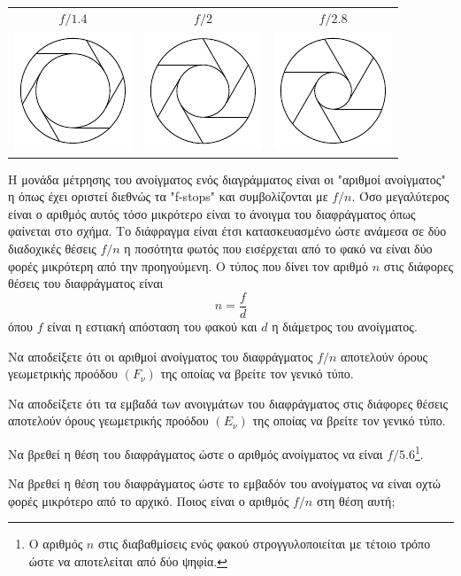 \documentclass[a4paper,11pt]{article}
\begin{document}
\begin{center}
\begin{tabular}{ccc}
$ f/1.4 $ & $ f/2 $ & $ f/2.8 $\\
\includegraphics{Sxhmata/1}
& 
\includegraphics{Sxhmata/2}
 & 
\includegraphics{Sxhmata/3}
 \\ 
\end{tabular} 
\end{center}
Η μονάδα μέτρησης του ανοίγματος ενός διαγράμματος είναι οι "αριθμοί ανοίγματος" η όπως έχει οριστεί διεθνώς τα "f-stops" και συμβολίζονται με $ f/n $. Όσο μεγαλύτερος είναι ο αριθμός αυτός τόσο μικρότερο είναι το άνοιγμα του διαφράγματος όπως φαίνεται στο σχήμα. Το διάφραγμα είναι έτσι κατασκευασμένο ώστε ανάμεσα σε δύο διαδοχικές θέσεις $ f/n $ η ποσότητα φωτός που εισέρχεται από το φακό να είναι δύο φορές μικρότερη από την προηγούμενη. Ο τύπος που δίνει τον αριθμό $ n $ στις διάφορες θέσεις του διαφράγματος είναι 
\[ n=\dfrac{f}{d} \]
όπου $ f $ είναι η εστιακή απόσταση του φακού και $ d $ η διάμετρος του ανοίγματος.
\begin{rlist}
\item Να αποδείξετε ότι οι αριθμοί ανοίγματος του διαφράγματος $ f/n $ αποτελούν όρους γεωμετρικής προόδου $ (F_\nu) $ της οποίας να βρείτε τον γενικό τύπο.
\item Να αποδείξετε ότι τα εμβαδά των ανοιγμάτων του διαφράγματος στις διάφορες θέσεις αποτελούν όρους γεωμετρικής προόδου $ (E_\nu) $ της οποίας να βρείτε τον γενικό τύπο.
\item Να βρεθεί η θέση του διαφράγματος ώστε ο αριθμός ανοίγματος να είναι $ f/5.6 $\footnote{Ο αριθμός $ n $ στις διαβαθμίσεις ενός φακού στρογγυλοποιείται με τέτοιο τρόπο ώστε να αποτελείται από δύο ψηφία.}.
\item Να βρεθεί η θέση του διαφράγματος ώστε το εμβαδόν του ανοίγματος να είναι οχτώ φορές μικρότερο από το αρχικό. Ποιος είναι ο αριθμός $ f/n $ στη θέση αυτή;
\end{rlist}
\end{document}
